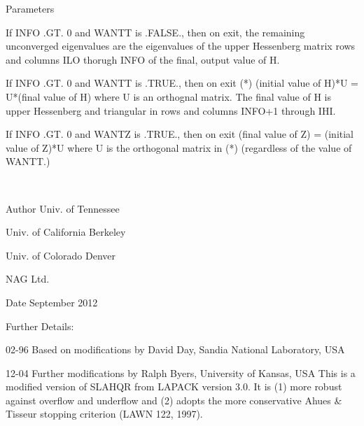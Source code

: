 \begin{DoxyParams}[1]{Parameters}
\begin{DoxyVerb}
                  If INFO .GT. 0 and WANTT is .FALSE., then on exit,
                  the remaining unconverged eigenvalues are the
                  eigenvalues of the upper Hessenberg matrix rows
                  and columns ILO thorugh INFO of the final, output
                  value of H.

                  If INFO .GT. 0 and WANTT is .TRUE., then on exit
          (*)       (initial value of H)*U  = U*(final value of H)
                  where U is an orthognal matrix.    The final
                  value of H is upper Hessenberg and triangular in
                  rows and columns INFO+1 through IHI.

                  If INFO .GT. 0 and WANTZ is .TRUE., then on exit
                      (final value of Z)  = (initial value of Z)*U
                  where U is the orthogonal matrix in (*)
                  (regardless of the value of WANTT.)\end{DoxyVerb}
 \\
\hline
\end{DoxyParams}
\begin{DoxyAuthor}{Author}
Univ. of Tennessee 

Univ. of California Berkeley 

Univ. of Colorado Denver 

N\+A\+G Ltd. 
\end{DoxyAuthor}
\begin{DoxyDate}{Date}
September 2012 
\end{DoxyDate}
\begin{DoxyParagraph}{Further Details\+: }
\begin{DoxyVerb}     02-96 Based on modifications by
     David Day, Sandia National Laboratory, USA

     12-04 Further modifications by
     Ralph Byers, University of Kansas, USA
     This is a modified version of SLAHQR from LAPACK version 3.0.
     It is (1) more robust against overflow and underflow and
     (2) adopts the more conservative Ahues & Tisseur stopping
     criterion (LAWN 122, 1997).\end{DoxyVerb}
 
\end{DoxyParagraph}
